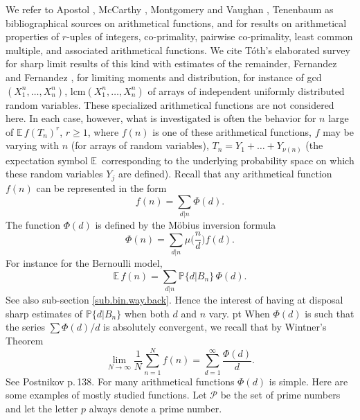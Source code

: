\documentclass[11pt,draft,reqno]{amsart}
\theoremstyle{definition}
\theoremstyle{remarks}
\numberwithin{equation}{section}
\def\P{{\mathcal P}}
\def\E{{\mathbb E \,}}
\def\P{{\mathbb P}}
\begin{document}
  \bigskip\par
 We refer to Apostol \cite{A}, McCarthy \cite{MC}, Montgomery and Vaughan \cite{MV}, Tenenbaum \cite{Te1}   as  bibliographical sources on arithmetical functions, and for results on arithmetical properties of $r$-uples of integers, co-primality,  pairwise co-primality,   least common multiple, and associated arithmetical functions.   We cite  T\'oth's elaborated survey \cite{To} for   sharp limit results of this kind with  estimates of the remainder,  Fernandez and Fernandez \cite{FF}, %
 for  limiting moments and distribution,   for instance of  {gcd}$ (X^n_1, \ldots, X^n_n)$, {lcm}$(X^n_1, \ldots, X^n_n)$ of  arrays of independent uniformly distributed random variables. These specialized arithmetical functions %
are not considered here.  In each 
case, however, what is investigated is often the behavior for $n$ large of $\E f(T_n)^r$, $r\ge 1$, where $f(n)$ is one of these  arithmetical functions, $f$ may be varying with $n$ (for arrays of random variables), $T_n= Y_1+\ldots+Y_{\nu(n)}$  (the expectation symbol $\E$ corresponding to the underlying probability space on which these random variables $Y_j$ are defined). 
Recall that any arithmetical function $f(n)$ can be represented in the form
$$ f(n) =\sum_{d|n} \Phi(d).$$
The function $\Phi(d)$ is defined by the M\"obius inversion formula
$$ \Phi(n)= \sum_{d|n}\mu\Big(\frac{n}{d}\Big) f(d)  .$$
For instance for the Bernoulli model,
$$\E f(n) =\sum_{d|n} \P\{d|B_n\}\,\Phi(d).$$
See also sub-section \ref{sub.bin.way.back}. Hence the interest of having at disposal sharp estimates of  $\P\{d|B_n\}$ when both $d$ and $n$ vary.
  pt
When $\Phi(d)$ is such that the series $\sum \Phi(d)/d$ is absolutely convergent, we recall that by Wintner's Theorem
$$ \lim_{N\to\infty}\frac{1}{N}\sum_{n=1}^Nf(n)= \sum_{d=1}^\infty \frac{\Phi(d)}{d}.$$
See  Postnikov \cite{Po} p.\,138. 
For many arithmetical functions $\Phi(d)$ is simple. Here are some examples of mostly studied functions. Let  $\mathcal P$ be the set of prime numbers and let the letter $p$ always denote a prime number.  
\end{document}
